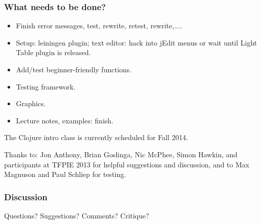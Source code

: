 \documentclass{beamer}
\begin{document}
\begin{frame}
  \frametitle{What needs to be done?}
\begin{itemize}
\item Finish error messages, test, rewrite, retest, rewrite,....
\item Setup: leiningen plugin; text editor: hack into jEdit menus or wait until Light Table plugin is released.
\item Add/test beginner-friendly functions. 
\item Testing framework.
\item Graphics. 
\item Lecture notes, examples: finish. 
\end{itemize}
The Clojure intro class is currently scheduled for Fall 2014. 

\vspace{.05in}

Thanks to: Jon Anthony, Brian Goslinga, Nic McPhee, Simon Hawkin, and participants at TFPIE 2013 for helpful suggestions and discussion, and to Max Magnuson and Paul Schliep for testing. 
\end{frame}



\begin{frame}
  \frametitle{Discussion}
Questions? Suggestions? Comments? Critique? 
\end{frame}
\end{document}
